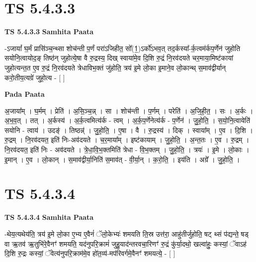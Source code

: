 \documentclass[17pt]{extarticle}
\begin{document}
\section{ TS 5.4.3.3 }

\textbf{TS 5.4.3.3 } \newline
\textbf{Samhita Paata} \newline

-ऽजायां᳚ घ॒र्मं प्रासि॑ञ्च॒न्थ्सा शोच॑न्ती प॒र्णं परा॑ऽजिहीत॒ सो᳚(1॒)ऽर्को॑ऽभव॒त् तद॒र्कस्या᳚-र्क॒त्वम॑र्कप॒र्णेन॑ जुहोति सयोनि॒त्वायोद॒ङ् तिष्ठ॑न् जुहोत्ये॒षा वै रु॒द्रस्य॒ दिख् स्वाया॑मे॒व दि॒शि रु॒द्रं नि॒रव॑दयते चर॒माया॒मिष्ट॑कायां जुहोत्यन्त॒त ए॒व रु॒द्रं नि॒रव॑दयते त्रेधाविभ॒क्तं जु॑होति॒ त्रय॑ इ॒मे लो॒का इ॒माने॒व लो॒कान्थ् स॒माव॑द्वीर्यान् करो॒तीय॒त्यग्रे॑ जुहो॒त्य - [  ] \newline

\textbf{Pada Paata} \newline

अ॒जाया᳚म् । घ॒र्मम् । प्रेति॑ । अ॒सि॒ञ्च॒न्न् । सा । शोच॑न्ती । प॒र्णम् । परेति॑ । अ॒जि॒ही॒त॒ । सः । अ॒र्कः । अ॒भ॒व॒त् । तत् । अ॒र्कस्य॑ । अ॒र्क॒त्वमित्य॑र्क - त्वम् । अ॒र्क॒प॒र्णेनेत्य॑र्क - प॒र्णेन॑ । जु॒हो॒ति॒ । स॒यो॒नि॒त्वायेति॑ सयोनि - त्वाय॑ । उदङ्॑ । तिष्ठन्न्॑ । जु॒हो॒ति॒ । ए॒षा । वै । रु॒द्रस्य॑ । दिक् । स्वाया᳚म् । ए॒व । दि॒शि । रु॒द्रम् । नि॒रव॑दयत॒ इति॑ निः-अव॑दयते । च॒र॒माया᳚म् । इष्ट॑कायाम् । जु॒हो॒ति॒ । अ॒न्त॒तः । ए॒व । रु॒द्रम् । नि॒रव॑दयत॒ इति॑ निः - अव॑दयते । त्रे॒धा॒वि॒भ॒क्तमिति॑ त्रेधा - वि॒भ॒क्तम् । जु॒हो॒ति॒ । त्रयः॑ । इ॒मे । लो॒काः । इ॒मान् । ए॒व । लो॒कान् । स॒माव॑द्वीर्या॒निति॑ स॒माव॑त् - वी॒र्या॒न् । क॒रो॒ति॒ । इय॑ति । अग्रे᳚ । जु॒हो॒ति॒ ।  \newline





\section{ TS 5.4.3.4 }

\textbf{TS 5.4.3.4 } \newline
\textbf{Samhita Paata} \newline

-थेय॒त्यथेय॑ति॒ त्रय॑ इ॒मे लो॒का ए॒भ्य ए॒वैनं॑ ॅलो॒केभ्यः॑ शमयति ति॒स्र उत्त॑रा॒ आहु॑तीर्जुहोति॒ षट् थ्सं प॑द्यन्ते॒ षड् वा ऋ॒तव॑ ऋ॒तुभि॑रे॒वैनꣳ॑ शमयति॒ यद॑नुपरि॒क्रामं॑ जुहु॒याद॑न्तरवचा॒रिणꣳ॑ रु॒द्रं कु॑र्या॒दथो॒ खल्वा॑हुः॒ कस्यां॒ ॅवाऽह॑ दि॒शि रु॒द्रः कस्यां॒ ॅवेत्य॑नुपरि॒क्राम॑मे॒व हो॑त॒व्य॑-मप॑रिवर्गमे॒वैनꣳ॑ शमयत्ये॒ - [  ] \newline
\end{document}
